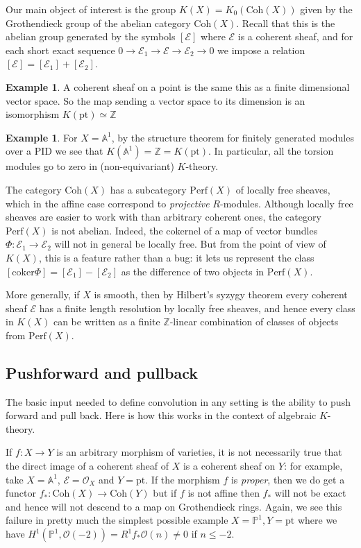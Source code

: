 \documentclass[11pt]{amsart}
\theoremstyle{definition}
\newtheorem{example}[dummy]{Example}
\newcommand{\bP}{\mathbb{P}}
\newcommand{\bZ}{\mathbb{Z}}
\newcommand{\Oc}{\mathcal{O}}
\newcommand{\Perf}{\mathrm{Perf}}
\newcommand{\cok}{\mathrm{coker}}
\newcommand{\Coh}{\mathrm{Coh}}
\numberwithin{equation}{subsection}
\numberwithin{figure}{subsection}
\newcommand{\pt}{\mathrm{pt}}
\begin{document}
Our main object of interest is the group $K(X) = K_0(\Coh(X))$ given by the Grothendieck group of the abelian category $\Coh(X)$. Recall that this is the abelian group generated by the symbols $[\mathcal{E}]$ where $\mathcal{E}$ is a coherent sheaf, and for each short exact sequence $0\rightarrow \mathcal{E}_1\rightarrow \mathcal{E}\rightarrow \mathcal{E}_2\rightarrow 0$ we impose a relation $[\mathcal{E}]=[\mathcal{E}_1]+[\mathcal{E}_2]$.
\begin{example}
A coherent sheaf on a point is the same this as a finite dimensional vector space. So the map sending a vector space to its dimension is an isomorphism $K(\pt)\simeq\bZ$
\end{example}

\begin{example}
For $X=\mathbb{A}^1$, by the structure theorem for finitely generated modules over a PID we see that $K(\mathbb{A}^1)=\mathbb{Z}=K(\pt)$. In particular, all the torsion modules go to zero in (non-equivariant) $K$-theory.
\end{example}

The category $\Coh(X)$ has a subcategory $\Perf(X)$ of locally free sheaves, which in the affine case correspond to \emph{projective} $R$-modules. 
 Although locally free sheaves are easier to work with than arbitrary coherent ones, the category $\Perf(X)$ is not abelian. Indeed, the cokernel of a map of vector bundles $\Phi:\mathcal{E}_1\rightarrow\mathcal{E}_2$ will not in general be locally free.   But from the point of view of  $K(X)$, this is a feature rather than a bug: it lets us represent  
the class $[\cok\Phi]=[\mathcal{E}_1]-[\mathcal{E}_2]$ as the difference of two objects in $\Perf(X)$.

More generally, if $X$ is smooth, then by Hilbert's syzygy theorem every coherent sheaf $\mathcal{E}$ has a finite length resolution by locally free sheaves, and hence every class in $K(X)$ can be written as a finite $\mathbb{Z}$-linear combination of classes of objects from $\Perf(X)$.


\subsection{Pushforward and pullback}
The basic input needed to define convolution in any setting is the ability to push forward and pull back. Here is how this works in the context of algebraic $K$-theory.

If $f:X\rightarrow Y$ is an arbitrary morphism of varieties, it is not necessarily true that the direct image of a coherent sheaf of $X$ is a coherent sheaf on $Y$: for example, take $X=\mathbb{A}^1$, $\mathcal{E}=\mathcal{O}_X$ and $Y=\pt$. If the morphism $f$ is \emph{proper}, then we do get a functor $f_*:\Coh(X)\rightarrow \Coh(Y)$ but if $f$ is not affine then $f_*$ will not be exact and hence will not descend to a map on Grothendieck rings. Again, we see this failure in pretty much the simplest possible example $X=\mathbb{P}^1, Y=\pt$ where we have $H^1(\bP^1,\Oc(-2)) = R^1f_*\Oc(n)\neq0$ if $n\leq-2$.
\end{document}
